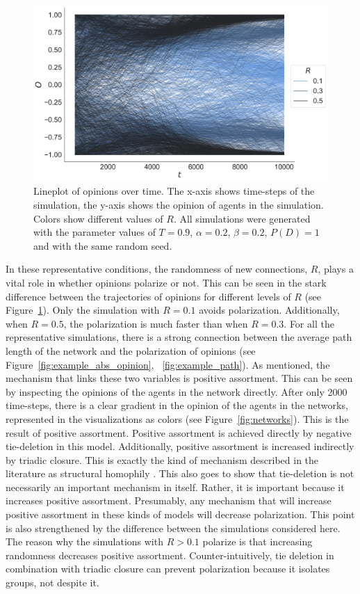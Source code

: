 \documentclass[11pt]{article}
\begin{document}
\begin{figure}[H]
    \centering
    \includegraphics[width=.8\linewidth]{../plots/example/Lineplot_Over_Time.pdf}
  \caption{Lineplot of opinions over time. The x-axis shows time-steps of the simulation, the y-axis shows the opinion of agents in the simulation. Colors show different values of $R$. All simulations were generated with the parameter values of $T = 0.9$, $\alpha = 0.2$, $\beta = 0.2$, $P(D) = 1$ and with the same random seed.}
  \label{fig:lineplot}
\end{figure}

\noindent In these representative conditions, the randomness of new connections, $R$, plays a vital role in whether opinions polarize or not. This can be seen in the stark difference between the trajectories of opinions for different levels of $R$ (see Figure~\ref{fig:lineplot}). Only the simulation with $R=0.1$ avoids polarization. Additionally, when $R=0.5$, the polarization is much faster than when $R=0.3$. For all the representative simulations, there is a strong connection between the average path length of the network and the polarization of opinions (see Figure~\ref{fig:example_abs_opinion}, ~\ref{fig:example_path}). As mentioned, the mechanism that links these two variables is positive assortment. This can be seen by inspecting the opinions of the agents in the network directly. After only 2000 time-steps, there is a clear gradient in the opinion of the agents in the networks, represented in the visualizations as colors (see Figure~\ref{fig:networks}). This is the result of positive assortment. Positive assortment is achieved directly by negative tie-deletion in this model. Additionally, positive assortment is increased indirectly by triadic closure. This is exactly the kind of mechanism described in the literature as structural homophily \cite{asikainen_cumulative_2020,peixoto_disentangling_2022}. This also goes to show that tie-deletion is not necessarily an important mechanism in itself. Rather, it is important because it increases positive assortment. Presumably, any mechanism that will increase positive assortment in these kinds of models will decrease polarization. This point is also strengthened by the difference between the simulations considered here. The reason why the simulations with $R > 0.1$ polarize is that increasing randomness decreases positive assortment. Counter-intuitively, tie deletion in combination with triadic closure can prevent polarization because it isolates groups, not despite it. 
\end{document}
